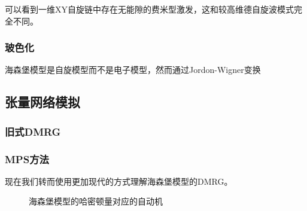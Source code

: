 可以看到一维XY自旋链中存在无能隙的费米型激发，这和较高维德自旋波模式完全不同。

\subsubsection{玻色化}

海森堡模型是自旋模型而不是电子模型，然而通过Jordon-Wigner变换 %

\subsection{张量网络模拟}



\subsubsection{旧式DMRG}



\subsubsection{MPS方法}

现在我们转而使用更加现代的方式理解海森堡模型的DMRG。

\begin{figure}
    \centering
    
    \caption{海森堡模型的哈密顿量对应的自动机}
    \label{fig:heisenberg-automata}
\end{figure}


